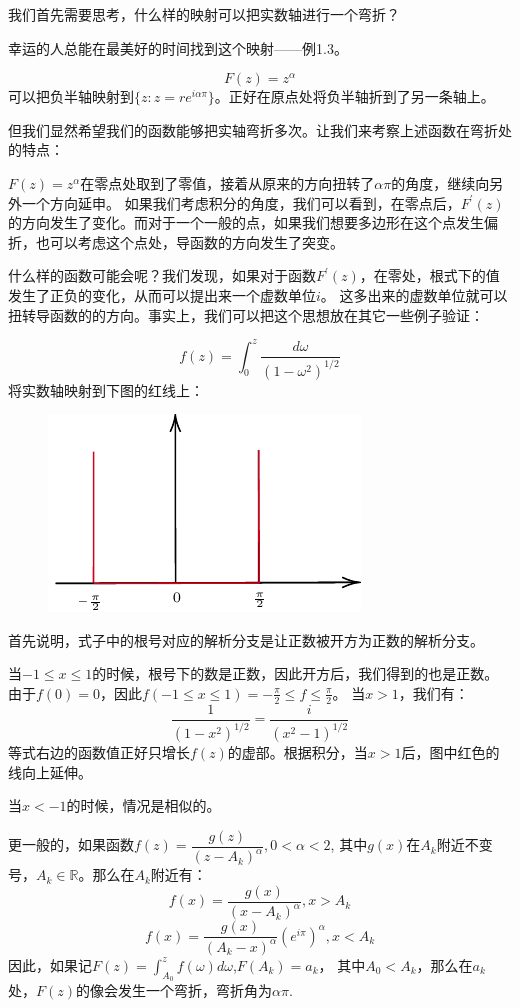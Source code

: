 \documentclass[UTF8]{ctexart}[a4paper,10pt]
\def\R{\mathbb{R}}
\begin{document}
    我们首先需要思考，什么样的映射可以把实数轴进行一个弯折？

    幸运的人总能在最美好的时间找到这个映射——例1.3。
    \begin{example}
        $$
        F(z)=z^{\alpha}
        $$
        可以把负半轴映射到$\{z:z=re^{i\alpha \pi}\}$。正好在原点处将负半轴折到了另一条轴上。  
    \end{example}
   

    但我们显然希望我们的函数能够把实轴弯折多次。让我们来考察上述函数在弯折处的特点：

    $F(z)=z^\alpha$在零点处取到了零值，接着从原来的方向扭转了$\alpha \pi$的角度，继续向另外一个方向延申。
    如果我们考虑积分的角度，我们可以看到，在零点后，$F^{'}(z)$的方向发生了变化。而对于一个一般的点，如果我们想要多边形在这个点发生偏折，也可以考虑这个点处，导函数的方向发生了突变。

    什么样的函数可能会呢？我们发现，如果对于函数$F^{'}(z)$，在零处，根式下的值发生了正负的变化，从而可以提出来一个虚数单位$i$。
    这多出来的虚数单位就可以扭转导函数的的方向。事实上，我们可以把这个思想放在其它一些例子验证：
    \begin{example}
    $$
    f(z)=\int_0^z\frac{d\omega}{(1-\omega^2)^{1/2}}
    $$
    将实数轴映射到下图的红线上：
   
    \begin{figure}[H]
        \centering
        \includegraphics[scale=0.8]{例3.2.pdf}
    \end{figure}
    首先说明，式子中的根号对应的解析分支是让正数被开方为正数的解析分支。

    当$-1\leq x\leq1$的时候，根号下的数是正数，因此开方后，我们得到的也是正数。由于$f(0)=0$，因此$f(-1\leq x\leq 1)=-\frac{\pi}{2}\leq f\leq \frac{\pi}{2}$。
    当$x>1$，我们有：
    $$
    \frac{1}{(1-x^2)^{1/2}}=\frac{i}{(x^2-1)^{1/2}}
    $$
    等式右边的函数值正好只增长$f(z)$的虚部。根据积分，当$x>1$后，图中红色的线向上延伸。

    当$x<-1$的时候，情况是相似的。
    \end{example}
    \begin{pro}
    更一般的，如果函数$f(z)=\dfrac{g(z)}{(z-A_k)^{\alpha}},0<\alpha<2$,
    其中$g(x)$在$A_k$附近不变号，$A_k\in \R$。那么在$A_k$附近有：
   $$
    f(x)=\frac{g(x)}{(x-A_k)^\alpha},x>A_k
    $$
    $$
    f(x)=\frac{g(x)}{(A_k-x)^\alpha}(e^{i\pi})^\alpha,x<A_k
   $$
    因此，如果记$F(z)=\displaystyle\int_{A_0}^{z}f(\omega)d\omega$,$F(A_k)=a_k$，
    其中$A_0<A_k$，那么在$a_k$处，$F(z)$的像会发生一个弯折，弯折角为$\alpha \pi$.
    \end{pro}
\end{document}

